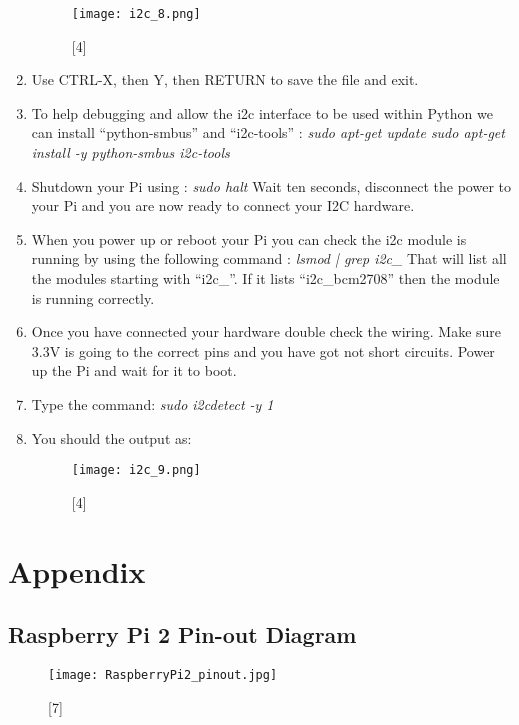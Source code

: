 \documentclass[11pt,a4paper]{article}
\begin{document}
\begin{enumerate}
		\begin{figure}[h!]
			\texttt{[image: i2c\_8.png]}
			\centering
			\caption{[4]}
		\end{figure}
		\item Use CTRL-X, then Y, then RETURN to save the file and exit.
		\item To help debugging and allow the i2c interface to be used within Python we can install “python-smbus” and “i2c-tools” : \newline \textit{sudo apt-get update \newline sudo apt-get install -y python-smbus i2c-tools}
		\item Shutdown your Pi using : \newline \textit{sudo halt} \newline Wait ten seconds, disconnect the power to your Pi and you are now ready to connect your I2C hardware.
		\item When you power up or reboot your Pi you can check the i2c module is running by using the following command : \newline \textit{lsmod | grep i2c\_} \newline That will list all the modules starting with “i2c\_”. If it lists “i2c\_bcm2708” then the module is running correctly.
		\item Once you have connected your hardware double check the wiring. Make sure 3.3V is going to the correct pins and you have got not short circuits. Power up the Pi and wait for it to boot.
		\item Type the command: \newline \textit{sudo i2cdetect -y 1} 
		\item You should the output as:
			\begin{figure}[h!]
				\texttt{[image: i2c\_9.png]}
				\centering
				\caption{[4]}
			\end{figure}	
	\end{enumerate}
	
	\newpage

	\section{Appendix}
	\subsection{Raspberry Pi 2 Pin-out Diagram}
	\begin{figure}[h!]
		\texttt{[image: RaspberryPi2\_pinout.jpg]}
		\centering
		\caption{[7]}
	\end{figure}
	
\end{document}
